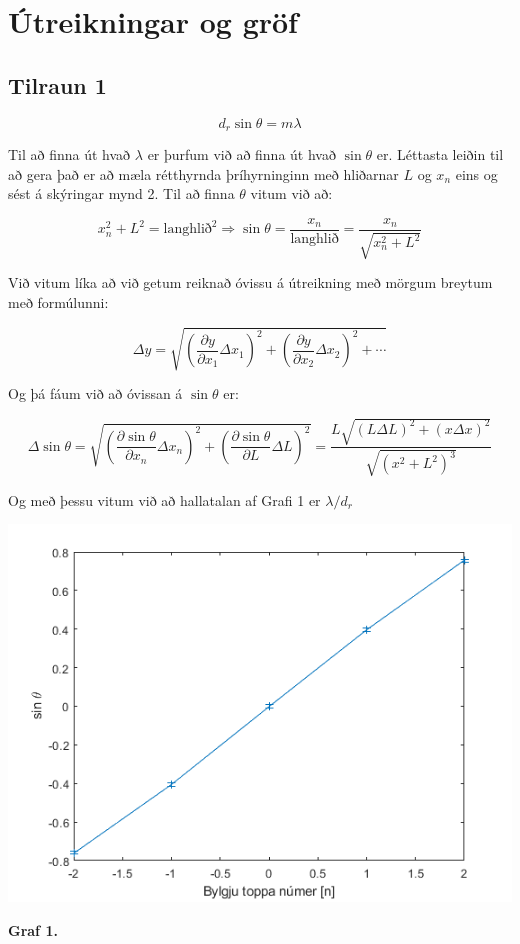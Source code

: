 \documentclass[12pt]{article}
\begin{document}
\section{Útreikningar og gröf}

\subsection{Tilraun 1}

\[d_r \sin{\theta} = m\lambda\]

Til að finna út hvað $\lambda$ er þurfum við að finna út hvað $\sin{\theta}$ er. Léttasta leiðin til að gera það er að mæla rétthyrnda þríhyrninginn með hliðarnar $L$ og $x_n$ eins og sést á skýringar mynd 2. Til að finna $\theta$ vitum við að:

\[x_n^2+L^2=\text{langhlið}^2 \Rightarrow \sin{\theta}=\dfrac{x_n}{\text{langhlið}}=\dfrac{x_n}{\sqrt{x_n^2+L^2}}\]

Við vitum líka að við getum reiknað óvissu á útreikning með mörgum breytum með formúlunni:

\[\Delta y = \sqrt{\left(\dfrac{\partial y}{\partial x_1} \Delta x_1\right)^2+\left(\dfrac{\partial y}{\partial x_2} \Delta x_2\right)^2 + \cdots }\]

Og þá fáum við að óvissan á $\sin \theta$ er:

\[\Delta\sin\theta=\sqrt{\left(\dfrac{\partial\sin\theta}{\partial x_n} \Delta x_n\right)^2+\left(\dfrac{\partial\sin\theta}{\partial L} \Delta L\right)^2}=\dfrac{L\sqrt{(L\Delta L)^2+(x\Delta x)^2}}{\sqrt{(x^2+L^2)^3}}\]

Og með þessu vitum við að hallatalan af Grafi 1 er $\lambda / d_r$

\begin{center}
    \includegraphics[scale=0.5]{html/data_01.png}

    \bf Graf 1.
\end{center}
\end{document}
